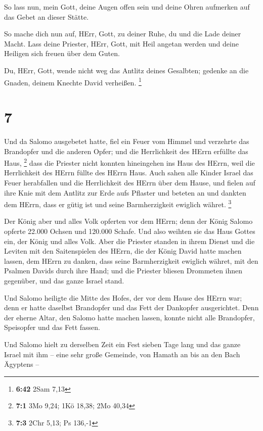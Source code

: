  So lass nun, mein Gott, deine Augen offen sein und deine
Ohren aufmerken auf das Gebet an dieser Stätte.

 So mache dich nun auf, HErr, Gott, zu deiner Ruhe, du und
die Lade deiner Macht. Lass deine Priester, HErr, Gott, mit Heil angetan
werden und deine Heiligen sich freuen über dem Guten.

 Du, HErr, Gott, wende nicht weg das Antlitz deines
Gesalbten; gedenke an die Gnaden, deinem Knechte David verheißen.
\footnote{\textbf{6:42} 2Sam 7,13}

\hypertarget{section-2}{%
\section{7}\label{section-2}}

 Und da Salomo ausgebetet hatte, fiel ein Feuer vom Himmel
und verzehrte das Brandopfer und die anderen Opfer; und die Herrlichkeit
des HErrn erfüllte das Haus, \footnote{\textbf{7:1} 3Mo 9,24; 1Kö 18,38;
  2Mo 40,34}  dass die Priester nicht konnten hineingehen
ins Haus des HErrn, weil die Herrlichkeit des HErrn füllte des HErrn
Haus.  Auch sahen alle Kinder Israel das Feuer herabfallen
und die Herrlichkeit des HErrn über dem Hause, und fielen auf ihre Knie
mit dem Antlitz zur Erde aufs Pflaster und beteten an und dankten dem
HErrn, dass er gütig ist und seine Barmherzigkeit ewiglich währet.
\footnote{\textbf{7:3} 2Chr 5,13; Ps 136,-1}

 Der König aber und alles Volk opferten vor dem HErrn;
 denn der König Salomo opferte 22.000 Ochsen und 120.000
Schafe. Und also weihten sie das Haus Gottes ein, der König und alles
Volk.  Aber die Priester standen in ihrem Dienst und die
Leviten mit den Saitenspielen des HErrn, die der König David hatte
machen lassen, dem HErrn zu danken, dass seine Barmherzigkeit ewiglich
währet, mit den Psalmen Davids durch ihre Hand; und die Priester bliesen
Drommeten ihnen gegenüber, und das ganze Israel stand.

 Und Salomo heiligte die Mitte des Hofes, der vor dem Hause
des HErrn war; denn er hatte daselbst Brandopfer und das Fett der
Dankopfer ausgerichtet. Denn der eherne Altar, den Salomo hatte machen
lassen, konnte nicht alle Brandopfer, Speisopfer und das Fett fassen.

 Und Salomo hielt zu derselben Zeit ein Fest sieben Tage
lang und das ganze Israel mit ihm -- eine sehr große Gemeinde, von
Hamath an bis an den Bach Ägyptens --

